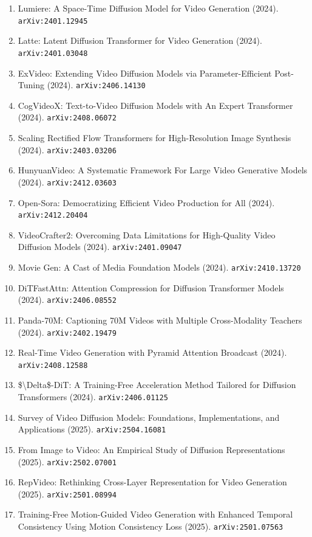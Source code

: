 \documentclass[11pt]{article}
\begin{document}
\begin{enumerate}
  \item Lumiere: A Space-Time Diffusion Model for Video Generation (2024). \texttt{arXiv:2401.12945}
  \item Latte: Latent Diffusion Transformer for Video Generation (2024). \texttt{arXiv:2401.03048}
  \item ExVideo: Extending Video Diffusion Models via Parameter-Efficient
  Post-Tuning (2024). \texttt{arXiv:2406.14130}
  \item CogVideoX: Text-to-Video Diffusion Models with An Expert Transformer (2024). \texttt{arXiv:2408.06072}
  \item Scaling Rectified Flow Transformers for High-Resolution Image Synthesis (2024). \texttt{arXiv:2403.03206}
  \item HunyuanVideo: A Systematic Framework For Large Video Generative Models (2024). \texttt{arXiv:2412.03603}
  \item Open-Sora: Democratizing Efficient Video Production for All (2024). \texttt{arXiv:2412.20404}
  \item VideoCrafter2: Overcoming Data Limitations for High-Quality Video
  Diffusion Models (2024). \texttt{arXiv:2401.09047}
  \item Movie Gen: A Cast of Media Foundation Models (2024). \texttt{arXiv:2410.13720}
  \item DiTFastAttn: Attention Compression for Diffusion Transformer Models (2024). \texttt{arXiv:2406.08552}
  \item Panda-70M: Captioning 70M Videos with Multiple Cross-Modality Teachers (2024). \texttt{arXiv:2402.19479}
  \item Real-Time Video Generation with Pyramid Attention Broadcast (2024). \texttt{arXiv:2408.12588}
  \item \$\textbackslash{}Delta\$-DiT: A Training-Free Acceleration Method Tailored for Diffusion
  Transformers (2024). \texttt{arXiv:2406.01125}
  \item Survey of Video Diffusion Models: Foundations, Implementations, and Applications (2025). \texttt{arXiv:2504.16081}
  \item From Image to Video: An Empirical Study of Diffusion Representations (2025). \texttt{arXiv:2502.07001}
  \item RepVideo: Rethinking Cross-Layer Representation for Video Generation (2025). \texttt{arXiv:2501.08994}
  \item Training-Free Motion-Guided Video Generation with Enhanced Temporal
  Consistency Using Motion Consistency Loss (2025). \texttt{arXiv:2501.07563}

\end{enumerate}
\end{document}
